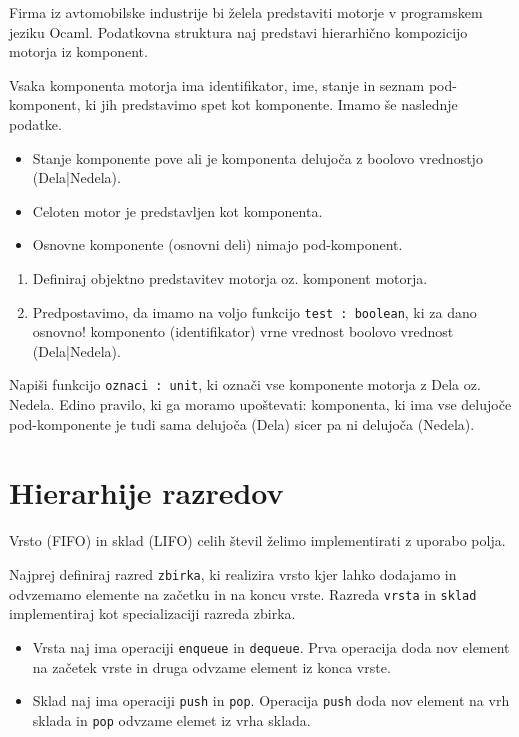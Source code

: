 \begin{ex}
Firma iz avtomobilske industrije bi \v zelela predstaviti motorje v programskem jeziku Ocaml. Podatkovna struktura naj predstavi hierarhi\v cno kompozicijo motorja iz komponent. 

Vsaka komponenta motorja ima identifikator, ime, stanje in seznam pod-komponent, ki jih predstavimo spet kot komponente. Imamo \v se naslednje podatke.
\begin{itemize}
\item Stanje komponente pove ali je komponenta delujo\v ca z boolovo vrednostjo (Dela|Nedela). 
\item Celoten motor je predstavljen kot komponenta. 
\item Osnovne komponente (osnovni deli) nimajo pod-komponent.
\end{itemize}
\begin{enumerate}
\item Definiraj objektno predstavitev motorja oz. komponent motorja.
\item Predpostavimo, da imamo na voljo funkcijo \lstinline{test : boolean}, ki za dano osnovno! komponento (identifikator) vrne vrednost boolovo vrednost (Dela|Nedela). 
\end{enumerate}
Napi\v si funkcijo \lstinline{oznaci : unit}, ki ozna\v ci vse komponente motorja z Dela oz. Nedela. Edino pravilo, ki ga moramo upo\v stevati: komponenta, ki ima vse delujo\v ce pod-komponente je tudi sama delujo\v ca (Dela) sicer pa ni delujo\v ca (Nedela). 
\end{ex}








\section{Hierarhije razredov}





\begin{ex}
Vrsto (FIFO) in sklad (LIFO) celih \v stevil \v zelimo implementirati z uporabo polja. 

Najprej definiraj razred \lstinline{zbirka}, ki realizira vrsto kjer lahko dodajamo in odvzemamo elemente na za\v cetku in na koncu vrste. 
Razreda \lstinline{vrsta} in \lstinline{sklad} implementiraj kot specializaciji razreda zbirka. 

\begin{itemize}
\item Vrsta naj ima operaciji \texttt{enqueue} in \texttt{dequeue}. Prva operacija doda nov element na za\v cetek vrste in druga odvzame element iz konca vrste. 

\item Sklad naj ima operaciji \texttt{push} in \texttt{pop}. Operacija \texttt{push} doda nov element na vrh sklada in \texttt{pop} odvzame elemet iz vrha sklada.
\end{itemize}
\end{ex}





